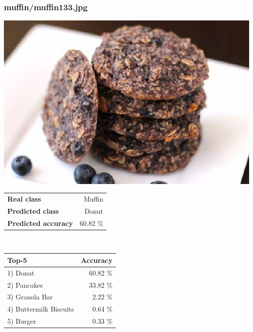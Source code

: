 \subsubsection{muffin/muffin133.jpg}

\begin{minipage}[t]{0.4\textwidth}
	\vspace{0pt}
	\includegraphics[width=\linewidth]{images/evaluation-images/muffin/muffin133.jpg}
\end{minipage}
\hfill
\begin{minipage}[t]{0.5\textwidth}
	\vspace{0pt}\raggedright
	\begin{tabularx}{\textwidth}{X r}
		\small \textbf{Real class} & \small Muffin\\
		\small \textbf{Predicted class} & \small Donut\\
		\small \textbf{Predicted accuracy} & \small 60.82 \%
    \end{tabularx}\\
    
    \vspace{6pt}
	\begin{tabularx}{\textwidth}{X r}
        \small \textbf{Top-5} & \small \textbf{Accuracy} \\
        \hline
		\small 1) Donut & \small 60.82 \%\\\small 2) Pancakes & \small 33.82 \%\\\small 3) Granola Bar & \small 2.22 \%\\\small 4) Buttermilk Biscuits & \small 0.64 \%\\\small 5) Burger & \small 0.33 \%
    \end{tabularx}
\end{minipage}
    
